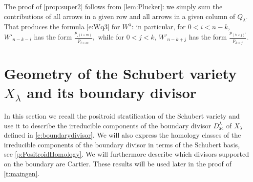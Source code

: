 \documentclass{amsart}
\theoremstyle{definition}
\numberwithin{equation}{section}
\newcommand{\ac}{\operatorname{ac}}
\begin{document}
The proof of \cref{prop:super2} 
follows from \cref{lem:Plucker}: we simply sum the contributions of all arrows in 
a given row and all arrows in a given column of $Q_{\lambda}$.  
That produces the formula 
\eqref{e:Wq3} 
for $W^{\lambda}$: in particular, for $0<i<n-k$,
$W'_{n-k-i}$ has the form 
$\frac{p_{_{\square}(i \times m)}}{p_{i \times m}},$
while for $0<j<k$,
$W'_{n-k+j}$ 
has the form $\frac{p_{(h \times j)^{\square}}}{p_{h \times j}}.$









\section{Geometry of the Schubert variety $X_\lambda$ and its boundary divisor}\label{s:GeometrySchubert}

In this section we recall the positroid stratification of the Schubert variety and use it to describe the irreducible components of the boundary divisor $D^\lambda_{\ac}$ of $X_{\lambda}$ defined in \eqref{e:boundarydivisor}. We will also express the homology classes of the irreducible components of the boundary divisor in terms of the Schubert basis, see \cref{p:PositroidHomology}.
We will furthermore describe which  divisors supported on the boundary are Cartier. 
These results will be used later in the proof of \cref{t:maingen}.
\end{document}
